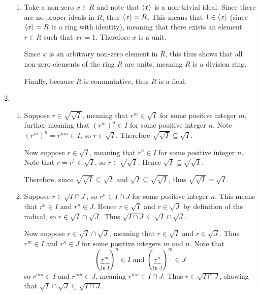 \begin{enumerate}
\begin{enumerate}[label=(\alph*)]
        \item Take a non-zero $x \in R$ and note that $\left\langle x\right\rangle$ is a non-trivial ideal. Since there are no proper ideals in $R$, thus $\left\langle x\right\rangle = R$. This means that $1 \in \left\langle x\right\rangle$ (since $\left\langle x\right\rangle = R$ is a ring with identity), meaning that there exists an element $r \in R$ such that $xr = 1$. Therefore $x$ is a unit.
        
        Since $x$ is an arbitrary non-zero element in $R$, this thus shows that all non-zero elements of the ring $R$ are units, meaning $R$ is a division ring.

        Finally, because $R$ is commutative, thus $R$ is a field.
    \end{enumerate}

    \item \begin{enumerate}[label=(\alph*)]
        \item Suppose $r \in \sqrt{\sqrt{I}}$, meaning that $r^m \in \sqrt{I}$ for some positive integer $m$, further meaning that $(r^m)^n \in I$ for some positive integer $n$. Note $(r^m)^n = r^{mn} \in I$, so $r \in \sqrt{I}$. Therefore $\sqrt{\sqrt{I}} \subseteq \sqrt{I}$.
        
        Now suppose $r \in \sqrt{I}$, meaning that $r^n \in I$ for some positive integer $n$. Note that $r = r^1 \in \sqrt{I}$, so $r \in \sqrt{\sqrt{I}}$. Hence $\sqrt{I} \subseteq \sqrt{\sqrt{I}}$.

        Therefore, since $\sqrt{\sqrt{I}} \subseteq \sqrt{I}$ and $\sqrt{I} \subseteq \sqrt{\sqrt{I}}$, thus $\sqrt{\sqrt{I}} = \sqrt{I}$.

        \item Suppose $r \in \sqrt{I\cap J}$, so $r^n \in I \cap J$ for some positive integer $n$. This means that $r^n \in I$ and $r^n \in J$. Hence $r \in \sqrt{I}$ and $r \in \sqrt{J}$ by definition of the radical, so $r \in \sqrt{I}\cap\sqrt{J}$. Thus $\sqrt{I\cap J} \subseteq \sqrt{I}\cap\sqrt{J}$.
        
        Now suppose $r \in \sqrt{I}\cap\sqrt{J}$, meaning that $r \in \sqrt{I}$ and $r \in \sqrt{J}$. Thus $r^m \in I$ and $r^n \in J$ for some positive integers $m$ and $n$. Note that
        \[
            (\underbrace{r^m}_{\text{In }I})^n \in I \text{ and } (\underbrace{r^n}_{\text{In }J})^m \in J
        \]
        so $r^{mn} \in I$ and $r^{mn} \in J$, meaning $r^{mn} \in I \cap J$. Thus $r \in \sqrt{I \cap J}$, showing that $\sqrt{I}\cap\sqrt{J} \subseteq \sqrt{I\cap J}$.


\end{enumerate}
\end{enumerate}
